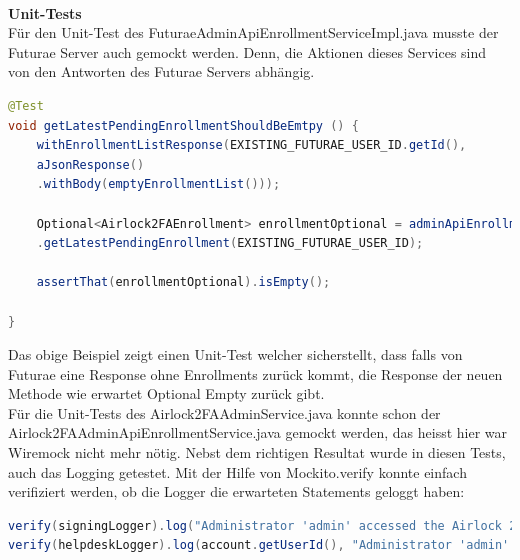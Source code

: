\\
\textbf{Unit-Tests}\\
Für den Unit-Test des FuturaeAdminApiEnrollmentServiceImpl.java musste der Futurae Server auch gemockt werden. Denn, die Aktionen dieses Services sind von den Antworten des Futurae Servers abhängig.
\begin{lstlisting}[language=Java]
@Test
void getLatestPendingEnrollmentShouldBeEmtpy () {
	withEnrollmentListResponse(EXISTING_FUTURAE_USER_ID.getId(),
	aJsonResponse()
	.withBody(emptyEnrollmentList()));
	
	Optional<Airlock2FAEnrollment> enrollmentOptional = adminApiEnrollmentService()
	.getLatestPendingEnrollment(EXISTING_FUTURAE_USER_ID);
	
	assertThat(enrollmentOptional).isEmpty();
	
}
\end{lstlisting}
Das obige Beispiel zeigt einen Unit-Test welcher sicherstellt, dass falls von Futurae eine Response ohne Enrollments zurück kommt, die Response der neuen Methode wie erwartet Optional Empty zurück gibt.\\
Für die Unit-Tests des Airlock2FAAdminService.java konnte schon der\\
Airlock2FAAdminApiEnrollmentService.java gemockt werden, das heisst hier war Wiremock nicht mehr nötig. Nebst dem richtigen Resultat wurde in diesen Tests, auch das Logging getestet. Mit der Hilfe von Mockito.verify konnte einfach verifiziert werden, ob die Logger die erwarteten Statements geloggt haben:
\begin{lstlisting}[language=Java]
verify(signingLogger).log("Administrator 'admin' accessed the Airlock 2FA short activation code of user 'user'.");
verify(helpdeskLogger).log(account.getUserId(), "Administrator 'admin' accessed the Airlock 2FA short activation code.");
\end{lstlisting}
